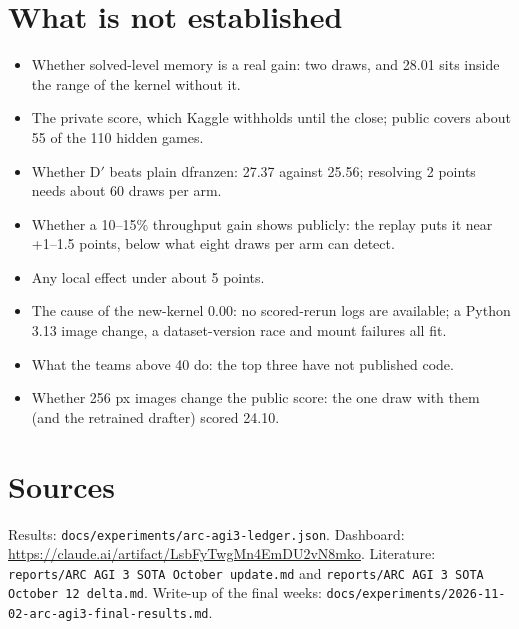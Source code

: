 \documentclass[11pt]{article}
\begin{document}
\section{What is not established}
\begin{itemize}
  \item Whether solved-level memory is a real gain: two draws, and 28.01 sits inside the range of the kernel without it.
  \item The private score, which Kaggle withholds until the close; public covers about 55 of the 110 hidden games.
  \item Whether D$'$ beats plain dfranzen: 27.37 against 25.56; resolving 2 points needs about 60 draws per arm.
  \item Whether a 10--15\% throughput gain shows publicly: the replay puts it near +1--1.5 points, below what
        eight draws per arm can detect.
  \item Any local effect under about 5 points.
  \item The cause of the new-kernel 0.00: no scored-rerun logs are available; a Python 3.13 image change, a
        dataset-version race and mount failures all fit.
  \item What the teams above 40 do: the top three have not published code.
  \item Whether 256 px images change the public score: the one draw with them (and the retrained drafter) scored 24.10.
\end{itemize}

\section*{Sources}
Results: \texttt{docs/experiments/arc-agi3-ledger.json}. Dashboard:
\url{https://claude.ai/artifact/LsbFyTwgMn4EmDU2vN8mko}. Literature: \texttt{reports/ARC AGI 3 SOTA October update.md} and
\texttt{reports/ARC AGI 3 SOTA October 12 delta.md}. Write-up of the final weeks:
\texttt{docs/experiments/2026-11-02-arc-agi3-final-results.md}.
\end{document}
